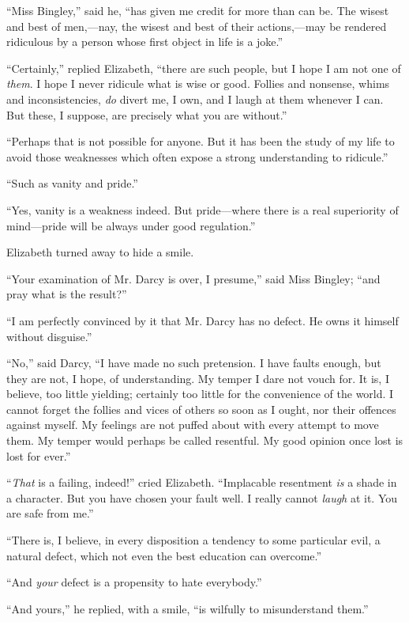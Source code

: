 \documentclass[12pt]{book}
\begin{document}
``Miss Bingley,'' said he, ``has given me credit for more than can be. The wisest and best of men,---nay, the wisest and best of their actions,---may be rendered ridiculous by a person whose first object in life is a joke.''

``Certainly,'' replied Elizabeth, ``there are such people, but I hope I am not one of \textit{them}. I hope I never ridicule what is wise or good. Follies and nonsense, whims and inconsistencies, \textit{do} divert me, I own, and I laugh at them whenever I can. But these, I suppose, are precisely what you are without.''

``Perhaps that is not possible for anyone. But it has been the study of my life to avoid those weaknesses which often expose a strong understanding to ridicule.''

``Such as vanity and pride.''

``Yes, vanity is a weakness indeed. But pride---where there is a real superiority of mind---pride will be always under good regulation.''

Elizabeth turned away to hide a smile.

``Your examination of Mr. Darcy is over, I presume,'' said Miss Bingley; ``and pray what is the result?''

``I am perfectly convinced by it that Mr. Darcy has no defect. He owns it himself without disguise.''

``No,'' said Darcy, ``I have made no such pretension. I have faults enough, but they are not, I hope, of understanding. My temper I dare not vouch for. It is, I believe, too little yielding; certainly too little for the convenience of the world. I cannot forget the follies and vices of others so soon as I ought, nor their offences against myself. My feelings are not puffed about with every attempt to move them. My temper would perhaps be called resentful. My good opinion once lost is lost for ever.''

``\textit{That} is a failing, indeed!'' cried Elizabeth. ``Implacable resentment \textit{is} a shade in a character. But you have chosen your fault well. I really cannot \textit{laugh} at it. You are safe from me.''

``There is, I believe, in every disposition a tendency to some particular evil, a natural defect, which not even the best education can overcome.''

``And \textit{your} defect is a propensity to hate everybody.''

``And yours,'' he replied, with a smile, ``is wilfully to misunderstand them.''
\end{document}
